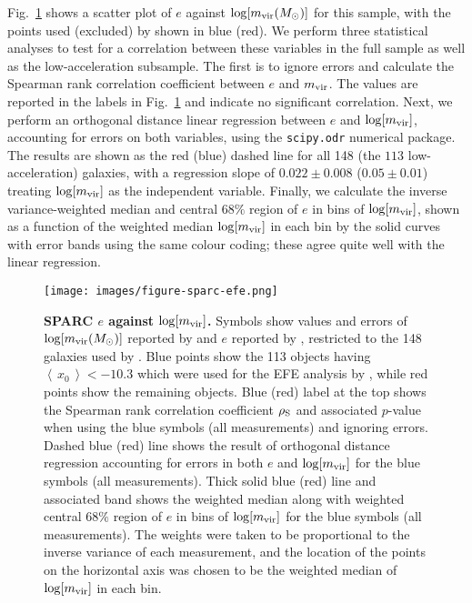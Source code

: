 \documentclass[usenatbib]{mnras}
\newcommand{\Msun}{\ensuremath{M_{\odot}}}
\newcommand{\avg}[1]{\ensuremath{\left\langle \,#1\, \right\rangle}}
\begin{document}
Fig.~\ref{fig:sparc-efe} shows a scatter plot of $e$ against $\log[m_{\rm vir} (\Msun)]$ for this sample, with the points used (excluded) by  shown in blue (red). We perform three statistical analyses to test for a correlation between these variables in the full sample as well as the low-acceleration subsample. The first is to ignore errors and calculate the Spearman rank correlation coefficient between $e$ and $m_{\rm vir}$. The values are reported in the labels in Fig.~\ref{fig:sparc-efe} and indicate no significant correlation. Next, we perform an orthogonal distance linear regression between $e$ and $\log[m_{\rm vir}]$, accounting for errors on both variables, using the \texttt{scipy.odr} numerical package. The results are shown as the red (blue) dashed line for all 148 (the $113$ low-acceleration) galaxies, with a regression slope of $0.022\pm0.008$ ($0.05\pm0.01$) treating $\log[m_{\rm vir}]$ as the independent variable. Finally, we calculate the inverse variance-weighted median and central $68\%$ region of $e$ in bins of $\log[m_{\rm vir}]$, shown as a function of the weighted median $\log[m_{\rm vir}]$ in each bin by the solid curves with error bands using the same colour coding; these agree quite well with the linear regression.

\begin{figure}
\centering
\texttt{[image: images/figure-sparc-efe.png]}
\caption{{\bf SPARC $e$ against $\log[m_{\rm vir}]$.} Symbols show values and errors of $\log[m_{\rm vir}(M_\odot)]$ reported by \citet{llms20} and $e$ reported by \citet{efe20}, restricted to the 148 %
galaxies used by \citet{efe20}. Blue points show the 113 objects having $\avg{x_0}<-10.3$ which were used for the EFE analysis by \citet[][see their fig.~5]{efe20}, while red points show the remaining objects.  Blue (red) label at the top shows the Spearman rank correlation coefficient $\rho_{\rm S}$ and associated $p$-value when using the blue symbols (all measurements) and ignoring errors. Dashed blue (red) line shows the result of orthogonal distance regression accounting for errors in both $e$ and $\log[m_{\rm vir}]$ for the blue symbols (all measurements). Thick solid blue (red) line and associated band shows the weighted median along with weighted central $68\%$ region of $e$ in bins of $\log[m_{\rm vir}]$ for the blue symbols (all measurements). The weights were taken to be proportional to the inverse variance of each measurement, and the location of the points on the horizontal axis was chosen to be the weighted median of $\log[m_{\rm vir}]$ in each bin.}
\label{fig:sparc-efe}
\end{figure}
\end{document}
